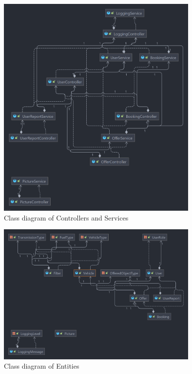 \begin{figure}[h]
	\centering
	\includegraphics[width=10cm]{resources/images/class diagrams/class-diagram_controller-services.png}
	\caption{Class diagram of Controllers and Services}
	\label{fig:cd:controller-services}
\end{figure}

\begin{figure}[h]
	\centering
	\includegraphics[width=10cm]{resources/images/class diagrams/class-diagram_entities.png}
	\caption{Class diagram of Entities}
	\label{fig:cd:entities}
\end{figure}

